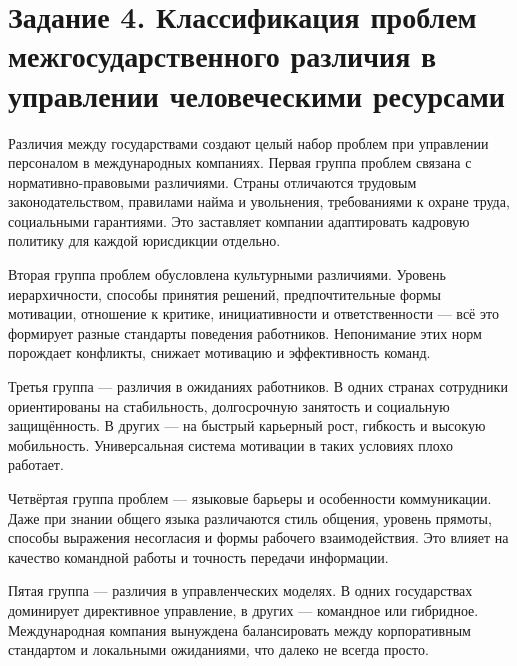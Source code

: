 \documentclass[14pt,a4paper]{extarticle}
\begin{document}
\section{Задание 4. Классификация проблем межгосударственного различия в управлении человеческими ресурсами}
\begin{sloppypar}
Различия между государствами создают целый набор проблем при управлении
    персоналом в международных компаниях. Первая группа проблем связана с
    нормативно-правовыми различиями. Страны отличаются трудовым
    законодательством, правилами найма и увольнения, требованиями к охране
    труда, социальными гарантиями. Это заставляет компании адаптировать
    кадровую политику для каждой юрисдикции отдельно.

    Вторая группа проблем обусловлена культурными различиями. Уровень
    иерархичности, способы принятия решений, предпочтительные формы мотивации,
    отношение к критике, инициативности и ответственности — всё это формирует
    разные стандарты поведения работников. Непонимание этих норм порождает
    конфликты, снижает мотивацию и эффективность команд.

    Третья группа — различия в ожиданиях работников. В одних странах сотрудники
    ориентированы на стабильность, долгосрочную занятость и социальную
    защищённость. В других — на быстрый карьерный рост, гибкость и высокую
    мобильность. Универсальная система мотивации в таких условиях плохо
    работает.

    Четвёртая группа проблем — языковые барьеры и особенности коммуникации.
    Даже при знании общего языка различаются стиль общения, уровень прямоты,
    способы выражения несогласия и формы рабочего взаимодействия. Это влияет на
    качество командной работы и точность передачи информации.

    Пятая группа — различия в управленческих моделях. В одних государствах
    доминирует директивное управление, в других — командное или гибридное.
    Международная компания вынуждена балансировать между корпоративным
    стандартом и локальными ожиданиями, что далеко не всегда просто.
\end{sloppypar}
\end{document}
